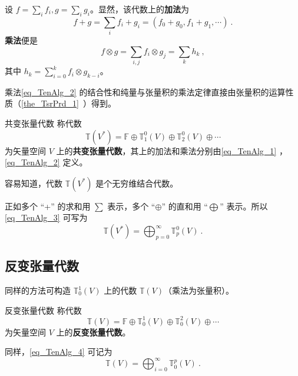 设 $f=\sum\limits_ i f_i,g=\sum\limits_ i g_i$。显然，该代数上的\textbf{加法}为
\begin{equation}\label{eq_TenAlg_1}
f+g=\sum_{i}f_i+g_i=(f_0+g_0,f_1+g_1,\cdots)~.
\end{equation}
\textbf{乘法}便是
\begin{equation}\label{eq_TenAlg_2}
f\otimes g=\sum_{i,j}f_i\otimes g_j=\sum_k h_k~,
\end{equation}
其中 $h_k=\sum\limits_{i=0}^k f_i\otimes g_{k-i}$。

乘法\autoref{eq_TenAlg_2} 的结合性和纯量与张量积的乘法定律直接由张量积的运算性质（\autoref{the_TsrPrd_1}~）得到。

\begin{definition}{共变张量代数}
称代数
\begin{equation}\label{eq_TenAlg_3}
\mathbb T(V^*)=\mathbb F\oplus\mathbb T_1^0(V)\oplus\mathbb T_2^0(V)\oplus\cdots
\end{equation}
为矢量空间 $V$ 上的\textbf{共变张量代数}，其上的加法和乘法分别由\autoref{eq_TenAlg_1} ，\autoref{eq_TenAlg_2} 定义。
\end{definition}

容易知道，代数 $\mathbb T(V^*)$ 是个无穷维结合代数。

正如多个 “+” 的求和用 $\sum$ 表示，多个 “$\oplus$” 的直和用 “$\bigoplus$” 表示。所以\autoref{eq_TenAlg_3} 可写为
\begin{equation}
\mathbb T(V^*)=\bigoplus_{p=0}^\infty\mathbb T_p^0(V)~.
\end{equation}
 
\subsection{反变张量代数}
同样的方法可构造 $\mathbb T^1_0(V)$ 上的代数 $\mathbb T(V)$（乘法为张量积）。
\begin{definition}{反变张量代数}
称代数
\begin{equation}\label{eq_TenAlg_4}
\mathbb T(V)=\mathbb F\oplus\mathbb T_0^1(V)\oplus\mathbb T_0^2(V)\oplus\cdots
\end{equation}
为矢量空间 $V$ 上的\textbf{反变张量代数}。
\end{definition}

同样，\autoref{eq_TenAlg_4} 可记为
\begin{equation}
\mathbb T(V)=\bigoplus_{i=0}^\infty \mathbb T_0^p(V)~.
\end{equation}

